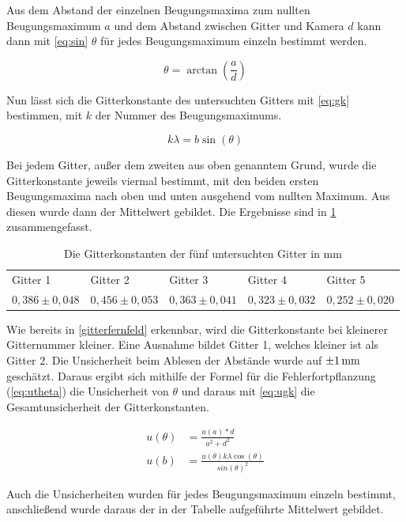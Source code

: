 Aus dem Abstand der einzelnen Beugungsmaxima zum nullten Beugungsmaximum $a$ und dem Abstand zwischen Gitter und Kamera $d$ kann dann mit \cref{eq:sin} $\theta$ für jedes Beugungsmaximum einzeln bestimmt werden.

\begin{equation}
	\theta = \arctan\left(\frac{a}{d}\right)
	\label{eq:sin}
\end{equation}

Nun lässt sich die Gitterkonstante des untersuchten Gitters mit \cref{eq:gk} bestimmen, mit $k$ der Nummer des Beugungsmaximums.

\begin{equation}
	k\lambda = b \sin(\theta)
	\label{eq:gk}
\end{equation}

Bei jedem Gitter, außer dem zweiten aus oben genanntem Grund, wurde die Gitterkonstante jeweils viermal bestimmt, mit den beiden ersten Beugungsmaxima nach oben und unten ausgehend vom nullten Maximum. Aus diesen wurde dann der Mittelwert gebildet. Die Ergebnisse sind in \cref{tab} zusammengefasst.

\begin{table}[h]
	\caption{Die Gitterkonstanten der fünf untersuchten Gitter in mm}
\begin{tabular}{lllll}
	Gitter 1 & Gitter 2& Gitter 3& Gitter 4& Gitter 5\\
	 $0,386\pm0,048$ & $0,456\pm0,053$ & $0,363\pm0,041$ & $0,323\pm0,032$ & $0,252\pm0,020$
\end{tabular}
\label{tab}
\end{table}

Wie bereits in \cref{gitterfernfeld} erkennbar, wird die Gitterkonstante bei kleinerer Gitternummer kleiner. Eine Ausnahme bildet Gitter 1, welches kleiner ist als Gitter 2.
Die Unsicherheit beim Ablesen der Abstände wurde auf $\SI{\pm1}{mm}$ geschätzt. Daraus ergibt sich mithilfe der Formel für die Fehlerfortpflanzung (\cref{eq:utheta}) die Unsicherheit von $\theta$ und daraus mit \cref{eq:ugk} die Gesamtunsicherheit der Gitterkonstanten.

\begin{align}
u(\theta) &= \frac{u(a)*d}{a^2 +d^2}
\label{eq:utheta}\\
u(b) &= \frac{u(\theta) k \lambda \cos(\theta)}{sin(\theta)^2}
\label{eq:ugk}
\end{align}

Auch die Unsicherheiten wurden für jedes Beugungsmaximum einzeln bestimmt, anschließend wurde daraus der in der Tabelle aufgeführte Mittelwert gebildet.

